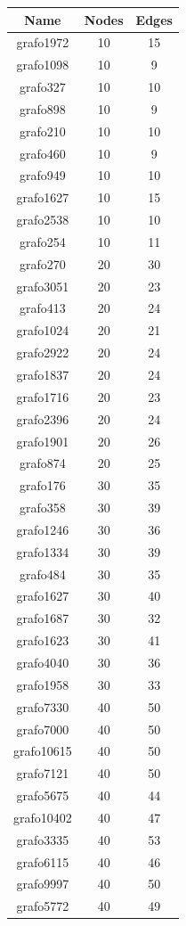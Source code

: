 \documentclass[bachelor, english]{algothesis}
\begin{document}
\newpage

\begin{minipage}{.32\textwidth} %
\hspace*{-2.1cm} 
\vspace*{0.75cm}
\begin{tabular}{|c|c|c|}
\hline
Name & Nodes & Edges \\
\hline
grafo1972 & 10 & 15 \\
grafo1098 & 10 & 9 \\
grafo327 & 10 & 10 \\
grafo898 & 10 & 9 \\
grafo210 & 10 & 10 \\
grafo460 & 10 & 9 \\
grafo949 & 10 & 10 \\
grafo1627 & 10 & 15 \\
grafo2538 & 10 & 10 \\
grafo254 & 10 & 11 \\
\hline
grafo270 & 20 & 30 \\
grafo3051 & 20 & 23 \\
grafo413 & 20 & 24 \\
grafo1024 & 20 & 21 \\
grafo2922 & 20 & 24 \\
grafo1837 & 20 & 24 \\
grafo1716 & 20 & 23 \\
grafo2396 & 20 & 24 \\
grafo1901 & 20 & 26 \\
grafo874 & 20 & 25 \\
\hline
grafo176 & 30 & 35 \\
grafo358 & 30 & 39 \\
grafo1246 & 30 & 36 \\
grafo1334 & 30 & 39 \\
grafo484 & 30 & 35 \\
grafo1627 & 30 & 40 \\
grafo1687 & 30 & 32 \\
grafo1623 & 30 & 41 \\
grafo4040 & 30 & 36 \\
grafo1958 & 30 & 33 \\
\hline
grafo7330 & 40 & 50 \\
grafo7000 & 40 & 50 \\
grafo10615 & 40 & 50 \\
grafo7121 & 40 & 50 \\
grafo5675 & 40 & 44 \\
grafo10402 & 40 & 47 \\
grafo3335 & 40 & 53 \\
grafo6115 & 40 & 46 \\
grafo9997 & 40 & 50 \\
grafo5772 & 40 & 49 \\
\hline
\end{tabular}
\end{minipage}%
\end{document}

